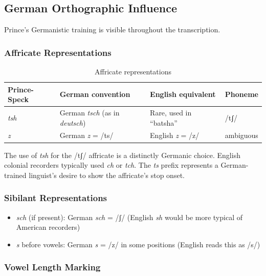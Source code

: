 \subsection{German Orthographic Influence}
\label{sec:1368-german}

Prince's Germanistic training is visible throughout the transcription.

\subsubsection{Affricate Representations}

\begin{table}[h]
\centering
\begin{tabular}{llll}
\toprule
\textbf{Prince-Speck} & \textbf{German convention} & \textbf{English equivalent} & \textbf{Phoneme} \\
\midrule
\textit{tsh} & German \textit{tsch} (as in \textit{deutsch}) & Rare, used in ``batsha'' & /tʃ/ \\
\textit{z} & German \textit{z} = /ts/ & English \textit{z} = /z/ & ambiguous \\
\bottomrule
\end{tabular}
\caption{Affricate representations}
\label{tab:1368-affricates}
\end{table}

The use of \textit{tsh} for the /tʃ/ affricate is a distinctly Germanic
choice. English colonial recorders typically used \textit{ch} or \textit{tch}.
The \textit{ts} prefix represents a German-trained linguist's desire to show
the affricate's stop onset.

\subsubsection{Sibilant Representations}

\begin{itemize}
  \item \textit{sch} (if present): German \textit{sch} = /ʃ/ (English
    \textit{sh} would be more typical of American recorders)
  \item \textit{s} before vowels: German \textit{s} = /z/ in some positions
    (English reads this as /s/)
\end{itemize}

\subsubsection{Vowel Length Marking}

